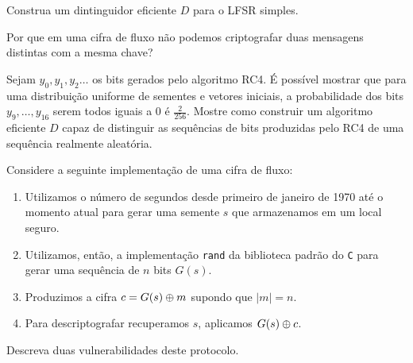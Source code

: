 \begin{exercicio}
  Construa um dintinguidor eficiente $D$ para o LFSR simples.
\end{exercicio}

\begin{exercicio}
  Por que em uma cifra de fluxo não podemos criptografar duas mensagens distintas com a mesma chave?
\end{exercicio}

\begin{exercicio}
 Sejam $y_0, y_1, y_2 \dots$ os bits gerados pelo algoritmo RC4.
É possível mostrar que para uma distribuição uniforme de sementes e vetores iniciais, a probabilidade dos bits $y_9, \dots, y_{16}$ serem todos iguais a $0$ é $\frac{2}{256}$.
Mostre como construir um algoritmo eficiente $D$ capaz de distinguir as sequências de bits produzidas pelo RC4 de uma sequência realmente aleatória.
\end{exercicio}

\begin{exercicio}
  Considere a seguinte implementação de uma cifra de fluxo:
\begin{enumerate}
\item Utilizamos o número de segundos desde primeiro de janeiro de 1970 até o momento atual para gerar uma semente $s$ que armazenamos em um local seguro.
\item Utilizamos, então, a implementação {\tt rand} da biblioteca padrão do {\tt C} para gerar uma sequência de $n$ bits $G(s)$.
\item Produzimos a cifra $c = G(s) \oplus m$ supondo que $|m| = n$.
\item Para descriptografar recuperamos $s$, aplicamos $G(s) \oplus c$.
\end{enumerate}

  Descreva duas vulnerabilidades deste protocolo.
\end{exercicio}
